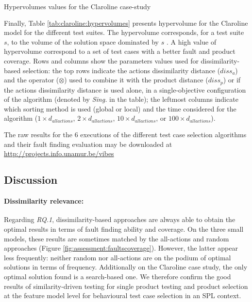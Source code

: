 \begin{table}
	\centering
	\caption{Hypervolumes values for the Claroline case-study}
	
	\label{tab:claroline:hypervolumes}
\end{table}

Finally, Table \ref{tab:claroline:hypervolumes} presents hypervolume for the Claroline model for the different test suites. The hypervolume corresponds, for a test suite $s$, to the volume of the solution space dominated by $s$ \cite{Brockhoff2008,Henard2015}. A high value of hypervolume correspond to a set of test cases with a better fault and product coverage.
Rows and columns show the parameters values used for dissimilarity-based selection: the top rows indicate the actions dissimilarity distance ($diss_a$) and the operator ($\otimes$) used to combine it with the product distance ($diss_p$) or if the actions dissimilarity distance is used alone, \ie  in a single-objective configuration of the algorithm (denoted by \textit{Sing.} in the table); the leftmost columns indicate which sorting method is used (global or local) and the time considered for the algorithm ($1 \times d_{allactions}$, $2 \times d_{allactions}$, $10 \times d_{allactions}$, or $100 \times d_{allactions}$). 

The raw results for the 6 executions of the different test case selection algorithms and their fault finding evaluation may be downloaded at \url{http://projects.info.unamur.be/vibes}


\subsection{Discussion}

\paragraph{Dissimilarity relevance:} 

Regarding \emph{RQ.1}, dissimilarity-based approaches are always able to obtain the optimal results in terms of fault finding ability and coverage.  On the three small models, these results are sometimes matched by the all-actions and random approaches (Figure \ref{fig:assessment:faultscoverage}).  However, the latter appear less frequently: neither random  nor all-actions are on the podium of optimal solutions in terms of frequency. Additionally on the Claroline case study, the only optimal solution found is a search-based one. We therefore confirm the good results of similarity-driven testing for single product testing \cite{Mondal2015} and product selection at the feature model level \cite{Henard2014a} for behavioural test case selection in an SPL context. 

